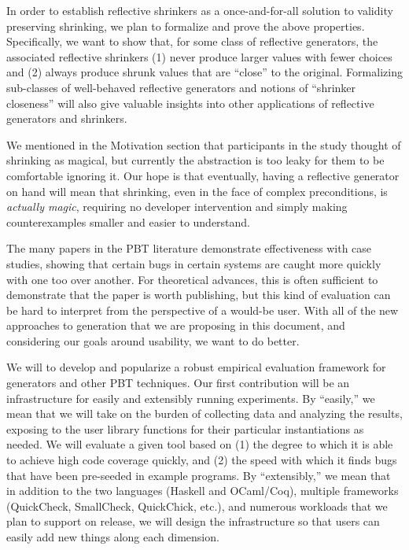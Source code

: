 In order to establish reflective shrinkers as a once-and-for-all solution to
validity preserving shrinking, we plan to formalize and prove the above
properties. Specifically, we want to show that, for some class of reflective
generators, the associated reflective shrinkers (1) never produce larger values
with fewer choices and (2) always produce shrunk values that are ``close'' to
the original. Formalizing sub-classes of well-behaved reflective generators and
notions of ``shrinker closeness'' will also give valuable insights into other
applications of reflective generators and shrinkers.

We mentioned in the Motivation section that participants in the study thought of
shrinking as magical, but currently the abstraction is too leaky for them to
be comfortable ignoring it.  Our hope is that eventually, having a reflective
generator on hand will mean that shrinking, even in the face of complex
preconditions, is {\em actually magic}, requiring no developer intervention and
simply making counterexamples smaller and easier to understand.

The many papers in the PBT literature demonstrate effectiveness with case
studies, showing that certain bugs in certain systems are caught more quickly
with one too over another. For theoretical advances, this is often sufficient
to demonstrate that the paper is worth publishing, but this kind of evaluation
can be hard to interpret from the perspective of a would-be user. With all of
the new approaches to generation that we are proposing in this document, and
considering our goals around usability, we want to do better.

We will to develop and popularize a robust empirical evaluation framework for
generators and other PBT techniques. Our first contribution will be an
infrastructure for easily and extensibly running experiments.  By ``easily,'' we
mean that we will take on the burden of collecting data and analyzing the
results, exposing to the user library functions for their particular
instantiations as needed. We will evaluate a given tool based on (1) the degree
to which it is able to achieve high code coverage quickly, and (2) the speed
with which it finds bugs that have been pre-seeded in example programs. By
``extensibly,'' we mean that in addition to the two languages (Haskell and
OCaml/Coq), multiple frameworks (QuickCheck, SmallCheck, QuickChick, etc.), and
numerous workloads that we plan to support on release, we will design the
infrastructure so that users can easily add new things along each dimension.

